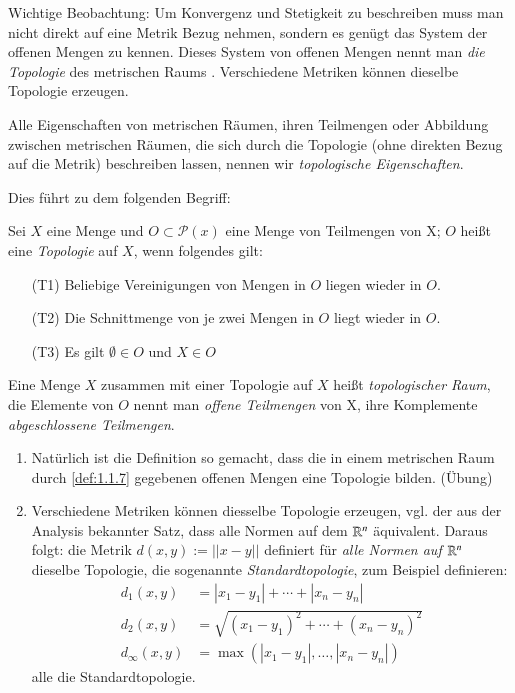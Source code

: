 \documentclass[a4paper,10pt]{scrartcl}
\begin{document}
Wichtige Beobachtung: Um Konvergenz und Stetigkeit zu beschreiben muss man nicht direkt auf eine Metrik Bezug nehmen, sondern es genügt das System der offenen Mengen zu kennen.  Dieses System von offenen Mengen nennt man \emph{die Topologie} des metrischen Raums .  Verschiedene Metriken können dieselbe Topologie erzeugen.

Alle Eigenschaften von metrischen Räumen, ihren Teilmengen oder Abbildung zwischen metrischen Räumen, die sich durch die Topologie (ohne direkten Bezug auf die Metrik) beschreiben lassen, nennen wir \emph{topologische Eigenschaften}.

Dies führt zu dem folgenden Begriff:
\begin{df}
Sei $ X $ eine Menge und $O \subset \mathcal P (x)$ eine Menge von Teilmengen von X; $ O $ heißt eine \emph{Topologie} auf $ X $, wenn folgendes gilt:
\begin{itemize}
\item[(T1)] Beliebige Vereinigungen von Mengen in $ O $ liegen wieder in $O$.
\item[(T2)] Die Schnittmenge von je zwei Mengen in $  O  $ liegt wieder in $O$.
\item[(T3)] Es gilt $ \emptyset \in O $ und $ X \in O$
\end{itemize}
Eine Menge $ X $ zusammen mit einer Topologie auf $ X $ heißt \emph{topologischer Raum}, die Elemente von $ O $ nennt man \emph{offene Teilmengen} von X, ihre Komplemente \emph{abgeschlossene Teilmengen}.
\end{df}
\begin{note*}
\begin{enumerate}
\item Natürlich ist die Definition so gemacht, dass die in einem metrischen Raum durch \ref{def:1.1.7} gegebenen offenen Mengen eine Topologie bilden. (Übung) 
\begin{figure}[H]
\centering
\fixme[fig5]
\caption{}
\end{figure}
\item Verschiedene Metriken können diesselbe Topologie erzeugen, vgl. der aus der Analysis bekannter Satz, dass alle Normen auf dem $ \mathbb{R}^n $ äquivalent.
  Daraus folgt: die Metrik $ d(x,y) :=||x-y|| $ definiert für \emph{alle Normen auf $ \mathbb{R}^n $} dieselbe Topologie, die sogenannte \emph{Standardtopologie}, zum Beispiel definieren:
\begin{align*}
d_1(x,y)&=|x_1-y_1|+\dotsb +|x_n-y_n|\\
d_2(x,y)&=\sqrt{(x_1-y_1)^2+\dotsb +(x_n-y_n)^2}\\
d_\infty(x,y)&=\max(|x_1-y_1|, \dotsc  , |x_n-y_n|)
\end{align*}
alle die Standardtopologie.
\end{enumerate}
\end{note*}
\end{document}
